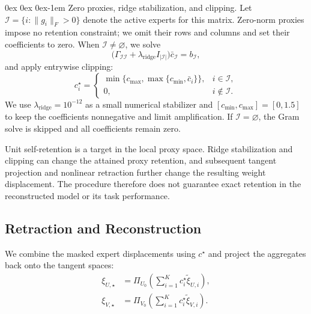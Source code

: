 \documentclass[11pt, a4paper]{utda}
\makeatletter
\renewcommand{\paragraph}{%
  \@startsection{paragraph}{4}%
  {\z@}{0ex \@plus 0ex \@minus 0ex}{-1em}%
  {\normalfont\normalsize\bfseries}%
}
\theoremstyle{plain}
\theoremstyle{definition}
\theoremstyle{remark}
\makeatother
\begin{document}
\paragraph{Zero proxies, ridge stabilization, and clipping.}
Let $\mathcal I=\{i:\|g_i\|_F>0\}$ denote the active experts for
this matrix. Zero-norm proxies impose no retention constraint;
we omit their rows and columns and set their coefficients to zero.
When $\mathcal I\neq\varnothing$, we solve
\begin{equation}
\label{eq:app_iso_merger_retention_system}
    \bigl(\Gamma_{\mathcal I\mathcal I}
          +\lambda_{\mathrm{ridge}}I_{|\mathcal I|}\bigr)
       \bar c_{\mathcal I}
    =b_{\mathcal I},
\end{equation}
and apply entrywise clipping:
\begin{equation}
\label{eq:app_iso_merger_clipping}
    c_i^\star=
    \begin{cases}
        \min\{c_{\max},\max\{c_{\min},\bar c_i\}\},
            & i\in\mathcal I,\\
        0, & i\notin\mathcal I.
    \end{cases}
\end{equation}
We use $\lambda_{\mathrm{ridge}}=10^{-12}$ as a small numerical
stabilizer and $[c_{\min},c_{\max}]=[0,1.5]$ to keep the
coefficients nonnegative and limit amplification.
If $\mathcal I=\varnothing$, the Gram solve is skipped and all
coefficients remain zero.

Unit self-retention is a target in the local proxy space.
Ridge stabilization and clipping can change the attained proxy
retention, and subsequent tangent projection and nonlinear
retraction further change the resulting weight displacement.
The procedure therefore does not guarantee exact retention
in the reconstructed model or its task performance.

\subsection{Retraction and Reconstruction}
\label{app:retract}

We combine the masked expert displacements using $c^\star$ and
project the aggregates back onto the tangent spaces:
\begin{equation}
\label{eq:iso_merger_aggregate_projection}
\begin{aligned}
    \xi_{U,\star}
    &=\Pi_{U_0}\!\left(
        \sum_{i=1}^K c_i^\star\widetilde\xi_{U,i}\right),\\
    \xi_{V,\star}
    &=\Pi_{V_0}\!\left(
        \sum_{i=1}^K c_i^\star\widetilde\xi_{V,i}\right).
\end{aligned}
\end{equation}
\end{document}
